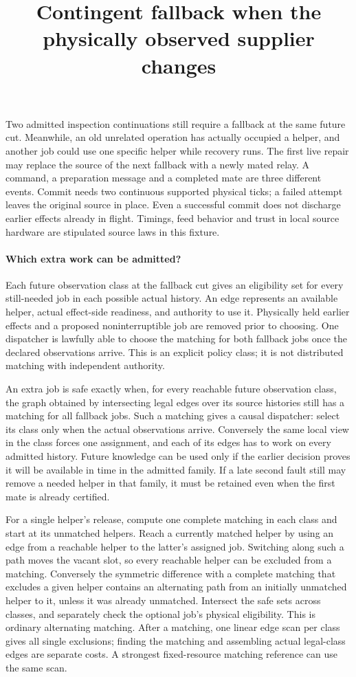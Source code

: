 \documentclass[11pt]{article}
\title{Contingent fallback when the physically observed supplier changes}
\author{}\date{}
\begin{document}
\maketitle
Two admitted inspection continuations still require a fallback at the
same future cut. Meanwhile, an old unrelated operation has actually
occupied a helper, and another job could use one specific helper while
recovery runs. The first live repair may replace the source of the next
fallback with a newly mated relay. A command, a preparation message and
a completed mate are three different events. Commit needs two continuous
supported physical ticks; a failed attempt leaves the original source
in place. Even a successful commit does not discharge earlier effects
already in flight. Timings, feed behavior and trust in local source
hardware are stipulated source laws in this fixture.

\paragraph{Which extra work can be admitted?}
Each future observation class at the fallback cut gives an eligibility
set for every still-needed job in each possible actual history. An
edge represents an available helper, actual effect-side readiness, and
authority to use it. Physically held earlier effects and a proposed
noninterruptible job are removed prior to choosing. One dispatcher is
lawfully able to choose the matching for both fallback jobs once the
declared observations arrive. This is an explicit policy class; it is
not distributed matching with independent authority.

An extra job is safe exactly when, for every reachable future
observation class, the graph obtained by intersecting legal edges
over its source histories still has a matching for all fallback jobs.
Such a matching gives a causal dispatcher: select its class only
when the actual observations arrive. Conversely the same local
view in the class forces one assignment, and each of its edges has
to work on every admitted history. Future knowledge can be used only
if the earlier decision proves it will be available in time in the
admitted family. If a late second fault still may remove a needed
helper in that family, it must be retained even when the first mate
is already certified.

For a single helper's release, compute one complete matching in each
class and start at its unmatched helpers. Reach a currently matched
helper by using an edge from a reachable helper to the latter's
assigned job. Switching along such a path moves the vacant slot,
so every reachable helper can be excluded from a matching. Conversely
the symmetric difference with a complete matching that excludes a
given helper contains an alternating path from an initially unmatched
helper to it, unless it was already unmatched. Intersect the safe
sets across classes, and separately check the optional job's physical
eligibility. This is ordinary alternating matching. After a matching,
one linear edge scan per class gives all single exclusions; finding the
matching and assembling actual legal-class edges are separate costs.
A strongest fixed-resource matching reference can use the same scan.
\end{document}
